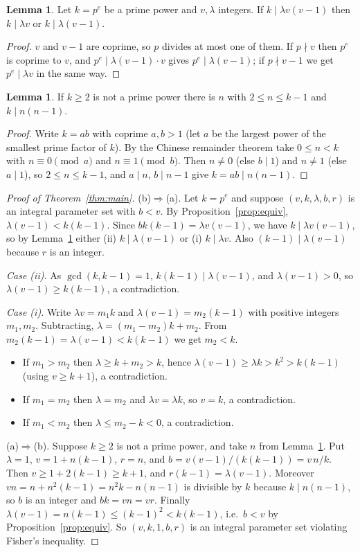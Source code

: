 \documentclass[11pt,a4paper]{article}
\theoremstyle{definition}
\newtheorem{lemma}[theorem]{Lemma}
\begin{document}
\begin{lemma}\label{lem:pp}
  Let $k=p^e$ be a prime power and $v,\lambda$ integers. If $k\mid\lambda v(v-1)$ then $k\mid\lambda v$ or $k\mid\lambda(v-1)$.
\end{lemma}
\begin{proof}
  $v$ and $v-1$ are coprime, so $p$ divides at most one of them.
  If $p\nmid v$ then $p^e$ is coprime to $v$, and $p^e\mid\lambda(v-1)\cdot v$ gives $p^e\mid\lambda(v-1)$; if $p\nmid v-1$ we get $p^e\mid\lambda v$ in the same way.
\end{proof}

\begin{lemma}\label{lem:idem}
  If $k\ge2$ is not a prime power there is $n$ with $2\le n\le k-1$ and $k\mid n(n-1)$.
\end{lemma}
\begin{proof}
  Write $k=ab$ with coprime $a,b>1$ (let $a$ be the largest power of the smallest prime factor of $k$).
  By the Chinese remainder theorem take $0\le n<k$ with $n\equiv0\pmod a$ and $n\equiv1\pmod b$.
  Then $n\ne0$ (else $b\mid1$) and $n\ne1$ (else $a\mid1$), so $2\le n\le k-1$, and $a\mid n$, $b\mid n-1$ give $k=ab\mid n(n-1)$.
\end{proof}

\begin{proof}[Proof of Theorem~\ref{thm:main}]
  (b)$\Rightarrow$(a). Let $k=p^e$ and suppose $(v,k,\lambda,b,r)$ is an integral parameter set with $b<v$.
  By Proposition~\ref{prop:equiv}, $\lambda(v-1)<k(k-1)$.
  Since $bk(k-1)=\lambda v(v-1)$, we have $k\mid\lambda v(v-1)$, so by Lemma~\ref{lem:pp} either (ii) $k\mid\lambda(v-1)$ or (i) $k\mid\lambda v$.
  Also $(k-1)\mid\lambda(v-1)$ because $r$ is an integer.

  \emph{Case (ii).} As $\gcd(k,k-1)=1$, $k(k-1)\mid\lambda(v-1)$, and $\lambda(v-1)>0$, so $\lambda(v-1)\ge k(k-1)$, a contradiction.

  \emph{Case (i).} Write $\lambda v=m_1k$ and $\lambda(v-1)=m_2(k-1)$ with positive integers $m_1,m_2$.
  Subtracting, $\lambda=(m_1-m_2)k+m_2$.
  From $m_2(k-1)=\lambda(v-1)<k(k-1)$ we get $m_2<k$.
  \begin{itemize}
    \item If $m_1>m_2$ then $\lambda\ge k+m_2>k$, hence $\lambda(v-1)\ge\lambda k>k^2>k(k-1)$ (using $v\ge k+1$), a contradiction.
    \item If $m_1=m_2$ then $\lambda=m_2$ and $\lambda v=\lambda k$, so $v=k$, a contradiction.
    \item If $m_1<m_2$ then $\lambda\le m_2-k<0$, a contradiction.
  \end{itemize}

  (a)$\Rightarrow$(b). Suppose $k\ge2$ is not a prime power, and take $n$ from Lemma~\ref{lem:idem}.
  Put $\lambda=1$, $v=1+n(k-1)$, $r=n$, and $b=v(v-1)/(k(k-1))=v\,n/k$.
  Then $v\ge1+2(k-1)\ge k+1$, and $r(k-1)=\lambda(v-1)$.
  Moreover $vn=n+n^2(k-1)=n^2k-n(n-1)$ is divisible by $k$ because $k\mid n(n-1)$, so $b$ is an integer and $bk=vn=vr$.
  Finally $\lambda(v-1)=n(k-1)\le(k-1)^2<k(k-1)$, i.e.\ $b<v$ by Proposition~\ref{prop:equiv}.
  So $(v,k,1,b,r)$ is an integral parameter set violating Fisher's inequality.
\end{proof}
\end{document}
